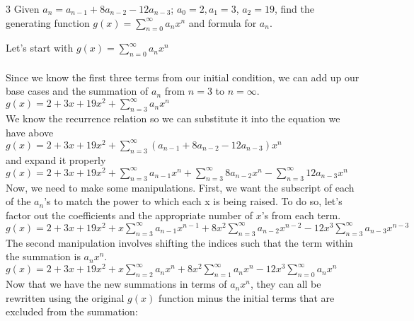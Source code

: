 \begin{problem} 3
Given $a_n = a_{n-1} + 8a_{n-2} - 12a_{n-3}$; $a_0 = 2, a_1 = 3$, $a_2 = 19$, find the generating function $g(x) = \sum_{n = 0}^\infty a_nx^n$ and formula for $a_n$.
\end{problem}
\begin{solution}

\noindent Let's start with $g(x) = \sum_{n = 0}^\infty a_nx^n$\\\\
\noindent
Since we know the first three terms from our initial condition, we can add up our base cases and the summation of $a_n$ from $n=3$ to $n=\infty$. \\

$g(x) = 2 + 3x + 19x^2 + \sum_{n = 3}^\infty a_nx^n$ \\

\noindent
We know the recurrence relation so we can substitute it into the equation we have above\\

$g(x) = 2 + 3x + 19x^2 + \sum_{n = 3}^\infty (a_{n-1} + 8a_{n-2} - 12a_{n-3})x^n$\\

\noindent
and expand it properly\\

$g(x) = 2 + 3x + 19x^2 + \sum_{n = 3}^\infty a_{n-1}x^n + \sum_{n = 3}^\infty 8a_{n-2}x^n - \sum_{n = 3}^\infty 12a_{n-3}x^n$ \\

\noindent
Now, we need to make some manipulations. First, we want the subscript of each of the $a_n$'s to match the power to which each x is being raised. To do so, let's factor out the coefficients and the appropriate number of $x$'s from each term.\\

$g(x) = 2 + 3x + 19x^2 + x\sum_{n = 3}^\infty a_{n-1}x^{n-1} + 8x^2\sum_{n = 3}^\infty a_{n-2}x^{n-2} - 12x^3\sum_{n = 3}^\infty a_{n-3}x^{n-3}$ \\

\noindent
The second manipulation involves shifting the indices such that the term within the summation is $a_nx^n$. \\

$g(x) = 2 + 3x + 19x^2 + x\sum_{n = 2}^\infty a_{n}x^{n} + 8x^2\sum_{n = 1}^\infty a_{n}x^{n} - 12x^3\sum_{n = 0}^\infty a_{n}x^{n}$ \\

\noindent
Now that we have the new summations in terms of $a_nx^n$, they can all be rewritten using the original $g(x)$ function minus the initial terms that are excluded from the summation:\\


\end{solution}
